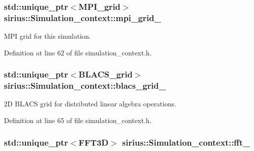 \subsubsection[{mpi\+\_\+grid\+\_\+}]{\setlength{\rightskip}{0pt plus 5cm}std\+::unique\+\_\+ptr$<${\bf M\+P\+I\+\_\+grid}$>$ sirius\+::\+Simulation\+\_\+context\+::mpi\+\_\+grid\+\_\+\hspace{0.3cm}{\ttfamily [private]}}\label{classsirius_1_1_simulation__context_aa39fe9cd213f9eaa7999bb95346de9b1}


M\+P\+I grid for this simulation. 



Definition at line 62 of file simulation\+\_\+context.\+h.

\hypertarget{classsirius_1_1_simulation__context_a9d27b4b363bf0572e54ba140b7ac0855}{}
\subsubsection[{blacs\+\_\+grid\+\_\+}]{\setlength{\rightskip}{0pt plus 5cm}std\+::unique\+\_\+ptr$<${\bf B\+L\+A\+C\+S\+\_\+grid}$>$ sirius\+::\+Simulation\+\_\+context\+::blacs\+\_\+grid\+\_\+\hspace{0.3cm}{\ttfamily [private]}}\label{classsirius_1_1_simulation__context_a9d27b4b363bf0572e54ba140b7ac0855}


2\+D B\+L\+A\+C\+S grid for distributed linear algebra operations. 



Definition at line 65 of file simulation\+\_\+context.\+h.

\hypertarget{classsirius_1_1_simulation__context_a54c14f3c86f05cc4c125c89b0ee940cf}{}
\subsubsection[{fft\+\_\+}]{\setlength{\rightskip}{0pt plus 5cm}std\+::unique\+\_\+ptr$<${\bf F\+F\+T3\+D}$>$ sirius\+::\+Simulation\+\_\+context\+::fft\+\_\+\hspace{0.3cm}{\ttfamily [private]}}\label{classsirius_1_1_simulation__context_a54c14f3c86f05cc4c125c89b0ee940cf}


